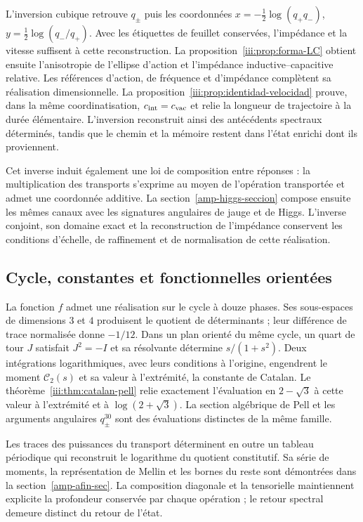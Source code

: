 L’inversion cubique retrouve $q_\pm$ puis les coordonnées
$x=-\frac12\log(q_+q_-)$,
$y=\frac12\log(q_-/q_+)$. Avec les étiquettes de feuillet conservées,
l’impédance et la vitesse suffisent à cette reconstruction.
La proposition~\ref{iii:prop:forma-LC} obtient ensuite
l’anisotropie de l’ellipse d’action et l’impédance inductive--capacitive
relative. Les références d’action, de fréquence et d’impédance complètent
sa réalisation dimensionnelle. La proposition~\ref{iii:prop:identidad-velocidad}
prouve, dans la même coordinatisation, $c_{\rm int}=c_{\rm vac}$ et relie la
longueur de trajectoire à la durée élémentaire. L’inversion
reconstruit ainsi des antécédents spectraux déterminés, tandis que le chemin
et la mémoire restent dans l’état enrichi dont ils proviennent.

Cet inverse induit également une loi de composition entre réponses :
la multiplication des transports s’exprime au moyen de l’opération
transportée et admet une coordonnée additive. La
section~\ref{amp-higgs-seccion} compose ensuite les mêmes canaux avec
les signatures angulaires de jauge et de Higgs. L’inverse conjoint, son
domaine exact et la reconstruction de l’impédance conservent les conditions
d’échelle, de raffinement et de normalisation de cette réalisation.

\subsection{Cycle, constantes et fonctionnelles orientées}

La fonction $f$ admet une réalisation sur le cycle à douze phases.
Ses sous-espaces de dimensions $3$ et $4$ produisent le quotient de
déterminants ; leur différence de trace normalisée donne $-1/12$.
Dans un plan orienté du même cycle, un quart de tour $J$ satisfait
$J^2=-I$ et sa résolvante détermine $s/(1+s^2)$. Deux intégrations
logarithmiques, avec leurs conditions à l’origine, engendrent le moment
$\mathcal C_2(s)$ et sa valeur à l’extrémité, la constante de Catalan.
Le théorème~\ref{iii:thm:catalan-pell} relie exactement
l’évaluation en $2-\sqrt3$ à cette valeur à l’extrémité et à
$\log(2+\sqrt3)$. La section algébrique de Pell et les arguments
angulaires $q_\pm^{30}$ sont des évaluations distinctes de la même famille.

Les traces des puissances du transport déterminent en outre un tableau
périodique qui reconstruit le logarithme du quotient constitutif.
Sa série de moments, la représentation de Mellin et les bornes du reste
sont démontrées dans la section~\ref{amp-afin-sec}. La composition diagonale
et la tensorielle maintiennent explicite la profondeur conservée par chaque
opération ; le retour spectral demeure distinct du retour de l’état.

